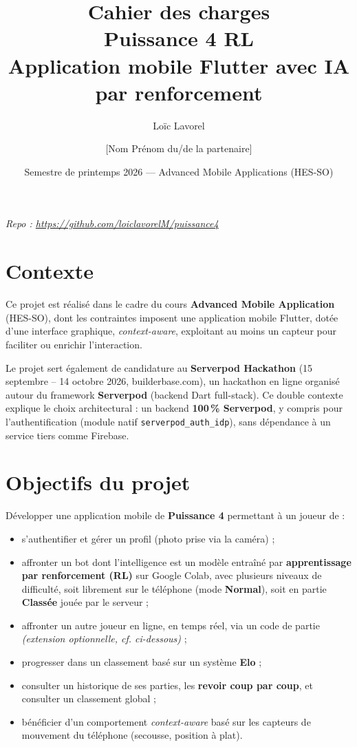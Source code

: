 \documentclass[a4paper,11pt]{article}
\title{\textbf{Cahier des charges} \\[4pt] \Large Puissance 4 RL \\[2pt] \large Application mobile Flutter avec IA par renforcement}
\author{Loïc Lavorel \and [Nom Prénom du/de la partenaire]}
\date{Semestre de printemps 2026 --- Advanced Mobile Applications (HES-SO)}
\begin{document}
\maketitle

\begin{center}
\textit{Repo : \url{https://github.com/loiclavorelM/puissance4}}
\end{center}

\vspace{0.5cm}

\tableofcontents
\newpage

\section{Contexte}

Ce projet est réalisé dans le cadre du cours \textbf{Advanced Mobile Application} (HES-SO),
dont les contraintes imposent une application mobile Flutter, dotée d'une interface
graphique, \textit{context-aware}, exploitant au moins un capteur pour faciliter ou
enrichir l'interaction.

Le projet sert également de candidature au \textbf{Serverpod Hackathon}
(15 septembre -- 14 octobre 2026, builderbase.com), un hackathon en ligne organisé
autour du framework \textbf{Serverpod} (backend Dart full-stack). Ce double contexte
explique le choix architectural : un backend \textbf{100\,\% Serverpod}, y compris
pour l'authentification (module natif \texttt{serverpod\_auth\_idp}), sans dépendance
à un service tiers comme Firebase.

\section{Objectifs du projet}

Développer une application mobile de \textbf{Puissance 4} permettant à un joueur de :

\begin{itemize}[leftmargin=1.5em]
  \item s'authentifier et gérer un profil (photo prise via la caméra) ;
  \item affronter un bot dont l'intelligence est un modèle entraîné par
        \textbf{apprentissage par renforcement (RL)} sur Google Colab, avec plusieurs
        niveaux de difficulté, soit librement sur le téléphone (mode
        \textbf{Normal}), soit en partie \textbf{Classée} jouée par le serveur ;
  \item affronter un autre joueur en ligne, en temps réel, via un code de partie
        \textit{(extension optionnelle, cf. ci-dessous)} ;
  \item progresser dans un classement basé sur un système \textbf{Elo} ;
  \item consulter un historique de ses parties, les \textbf{revoir coup par coup},
        et consulter un classement global ;
  \item bénéficier d'un comportement \textit{context-aware} basé sur les capteurs de
        mouvement du téléphone (secousse, position à plat).
\end{itemize}
\end{document}
